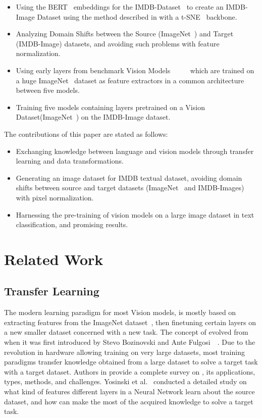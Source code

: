 \documentclass[conference]{IEEEtran}
\begin{document}
\begin{itemize}
    \item Using the BERT~\cite{Bert} embeddings for the IMDB-Dataset~\cite{imdb} to create
    an IMDB-Image Dataset using the method described in \cite{deepinsight} with a t-SNE~\cite{tsne} backbone. 
    \item Analyzing Domain Shifts between the Source (ImageNet~\cite{imagenet}) and Target (IMDB-Image) datasets, and avoiding such problems with feature normalization.
    \item Using early layers from benchmark Vision Models~\cite{alexnet}~\cite{shufflenetv2}~\cite{vgg16}~\cite{resnet}~\cite{resnext} which are trained on a huge ImageNet~\cite{imagenet} dataset as feature extractors in a common architecture between five models.
    \item Training five models containing layers pretrained on a Vision Dataset(ImageNet~\cite{imagenet}) on the IMDB-Image dataset.
\end{itemize}

The contributions of this paper are stated as follows:

\begin{itemize}
    \item Exchanging knowledge between language and vision models through transfer learning
        and data transformations.
    \item Generating an image dataset for IMDB textual dataset, avoiding domain shifts between source and target datasets (ImageNet~\cite{imagenet} and IMDB-Images) with pixel normalization.
    \item Harnessing the pre-training of vision models on a large image dataset in text classification, and promising results.
\end{itemize}

\section{Related Work}
\subsection{Transfer Learning}
 The modern learning paradigm for most Vision models, is mostly based on extracting features from the ImageNet dataset~\cite{imagenet}, then finetuning certain layers on a new smaller dataset concerned with a new task. The concept of  evolved from when it was first introduced by Stevo Bozinovski and Ante Fulgosi~\cite{transferlearning}~\cite{transferlearningreminder}. Due to the revolution in hardware allowing training on very large datasets, most training paradigms transfer knowledge obtained from a large dataset to solve a target task with a target dataset. Authors in \cite{compsurvey} provide a complete survey on , its applications, types, methods, and challenges. Yosinski et al.~\cite{howtransferable} conducted a detailed study on what kind of features different layers in a Neural Network learn about the source dataset, and how  can make the most of the acquired knowledge to solve a target task. 
\end{document}
